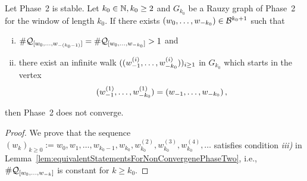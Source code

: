 \begin{thm}
Let Phase~2 is stable. Let $k_0\in\NN, k_0\geq 2$ and $G_{k_0}$ be a Rauzy graph of Phase~2 for the window of length $k_0$.  If there exists  $\tupleo{k_0}\in\B^{k_0+1}$ such that
\begin{enumerate}[i)]
	\item $\#\Qwo{(k_0-1)}=\#\Qwo{k_0}>1$ and
	\item there exist an infinite walk $(\tuple[w^{(i)}]{1}{k_0})_{i\geq 1}$ in $G_{k_0}$ which starts in the vertex  $$\tuple[w^{(1)}]{1}{k_0}=\tuple{1}{k_0}\,,$$ 
\end{enumerate}
then Phase~2 does not converge.
\end{thm}
\begin{proof}
We prove that the sequence $(w_k)_{k\geq 0}:=w_0, w_1, \dots , w_{k_0-1}, w_{k_0}, w_{k_0}^{(2)},w_{k_0}^{(3)},w_{k_0}^{(4)},\dots$ satisfies condition \textit{iii)} in Lemma~\ref{lem:equivalentStatementsForNonConvergenePhaseTwo}, i.e., $\#\Qwo{k}$ is constant for $k\geq k_0$.
\end{proof}














